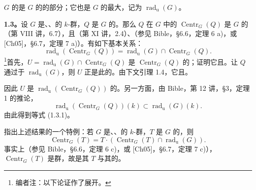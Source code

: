 $G$ 的是 $G$ 的的部分；它也是 $G$ 的最大，记为 $\operatorname{rad}_{\mathrm u}(G)$。

\textbf{1.3。}设 $G$ 是、、的 $k$-群，$Q$ 是 $G$ 的。那么 $Q$ 在 $G$ 中的 $\operatorname{Centr}_G(Q)$ 是 $G$ 的（第 VIII 讲，6.7），且（第 XI 讲，2.4）、（参见 Bible，\S 6.6，定理 6 a)，或 [Ch05]，\S 6.7，定理 7 a)）。有如下基本关系：
\begin{equation}
\operatorname{rad}_{\mathrm u}(\operatorname{Centr}_G(Q))=\operatorname{rad}_{\mathrm u}(G)\cap\operatorname{Centr}_G(Q).\tag{1.3.1}
\end{equation}
\footnote[4]{编者注：以下论证作了展开。}首先，$U=\operatorname{rad}_{\mathrm u}(G)\cap\operatorname{Centr}_G(Q)$ 是 $\operatorname{Centr}_G(Q)$ 的；证明它且。让 $Q$ 通过于 $\operatorname{rad}_{\mathrm u}(G)$，则 $U$ 正是此的。由下文引理 1.4，它且。

因此 $U$ 是 $\operatorname{rad}_{\mathrm u}(\operatorname{Centr}_G(Q))$ 的。另一方面，由 Bible，第 12 讲，\S 3，定理 1 的推论，
\[
\operatorname{rad}_{\mathrm u}(\operatorname{Centr}_G(Q))(k)\subset\operatorname{rad}_{\mathrm u}(G)(k).
\]
由此得到等式 (1.3.1)。

指出上述结果的一个特例：若 $G$ 是、、的 $k$-群，$T$ 是 $G$ 的，则
\begin{equation}
\operatorname{Centr}_G(T)=T\cdot(\operatorname{Centr}_G(T)\cap\operatorname{rad}_{\mathrm u}(G)).\tag{1.3.2}
\end{equation}
事实上（参见 Bible，\S 6.6，定理 6 c)，或 [Ch05]，\S 6.7，定理 7 c)），$\operatorname{Centr}_G(T)$ 是群，故是其 $T$ 与其的。

